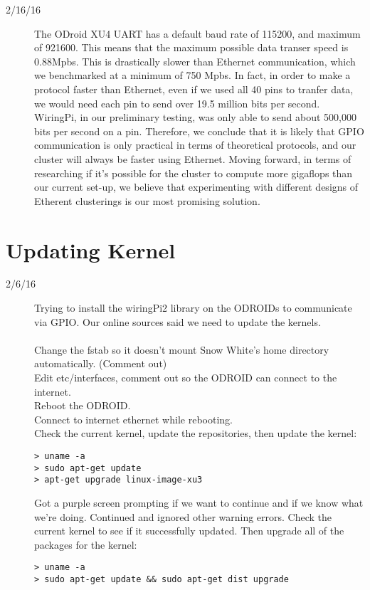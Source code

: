 \begin{description}
\item [2/16/16] The ODroid XU4 UART has a default baud rate of 115200, and maximum of 921600. This means that the maximum possible data transer speed is 0.88Mpbs. This is drastically slower than Ethernet communication, which we benchmarked at a minimum of 750 Mpbs. In fact, in order to make a protocol faster than Ethernet, even if we used all 40 pins to tranfer data, we would need each pin to send over 19.5 million bits per second. WiringPi, in our preliminary testing, was only able to send about 500,000 bits per second on a pin. Therefore, we conclude that it is likely that GPIO communication is only practical in terms of theoretical protocols, and our cluster will always be faster using Ethernet. Moving forward, in terms of researching if it's possible for the cluster to compute more gigaflops than our current set-up, we believe that experimenting with different designs of Etherent clusterings is our most promising solution.
\end{description}

\section{Updating Kernel}
\begin{description}
\item [2/6/16] Trying to install the wiringPi2 library on the ODROIDs to communicate via GPIO. Our online sources said we need to update the kernels. \\ \\
Change the fstab so it doesn't mount Snow White's home directory automatically. (Comment out) \\
Edit etc/interfaces, comment out so the ODROID can connect to the internet.\\
Reboot the ODROID.\\
Connect to internet ethernet while rebooting. \\
Check the current kernel, update the repositories, then update the kernel:
\begin{lstlisting}
> uname -a
> sudo apt-get update
> apt-get upgrade linux-image-xu3
\end{lstlisting}
Got a purple screen prompting if we want to continue and if we know what we're doing. Continued and ignored other warning errors. Check the current kernel to see if it successfully updated. Then upgrade all of the packages for the kernel: \\
\begin{lstlisting}
> uname -a
> sudo apt-get update && sudo apt-get dist upgrade
\end{lstlisting}
\end{description}

